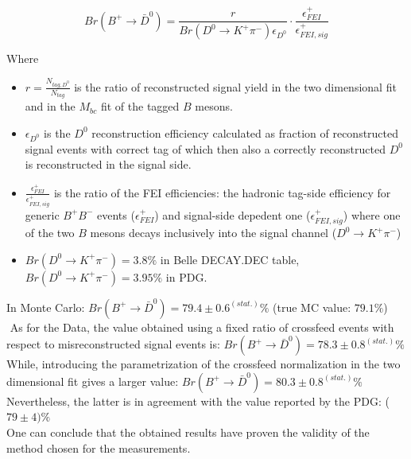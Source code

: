 \begin{equation}
    Br(B^+ \rightarrow \bar{D}^0) = \frac{r}{Br(D^0 \rightarrow K^+ \pi^-) \epsilon_{D^0}}  \cdot  \frac{\epsilon^{+}_{FEI}}{ \epsilon^{+}_{FEI,  sig} }
\end{equation}

Where 
\begin{itemize}

\item $r = \frac{N_{tag, D^0}}{N_{tag}}$ is the ratio of reconstructed signal yield in the two dimensional fit and in the $M_{bc}$ fit of the tagged $B$ mesons.
\item $\epsilon_{D^0} $ is the $D^0$ reconstruction efficiency calculated as fraction of reconstructed signal events with correct tag of which then also a correctly reconstructed $D^0$ is reconstructed in the signal side.
\item $\frac{\epsilon^{+}_{FEI}}{ \epsilon^{+}_{FEI,  sig }}$ is the ratio of the FEI efficiencies: the hadronic tag-side efficiency for generic $B^+B^-$ events ($\epsilon^{+}_{FEI}$) and signal-side depedent one ($\epsilon^{+}_{FEI,  sig}$)  where one of the two $B$ mesons decays inclusively into the signal channel ($D^0 \rightarrow K^+ \pi^- $) 
\item  $Br(D^0 \rightarrow K^+ \pi^-) = 3.8\% $ in Belle DECAY.DEC table,
$Br(D^0 \rightarrow K^+ \pi^-) = 3.95\% $ in PDG.
\end{itemize}

\vspace{0.2 cm}


In Monte Carlo:  \hspace{0.05cm} $Br(B^+ \rightarrow \bar{D}^0) = 79.4 \pm 0.6^{(stat.)} \%$ \hspace{1cm}  (true MC value: $79.1\%$) \\ %
\vspace{0.25 cm} \newline
\hspace{0.1cm}  $ $ As for the Data, the value obtained using a fixed ratio of crossfeed events with respect to misreconstructed signal events is:
  \hspace{0.05cm} $Br(B^+ \rightarrow \bar{D}^0) = 78.3 \pm 0.8^{(stat.)} \%$ \\
  \vspace{0.25 cm} \newline
  While, introducing the parametrization of the crossfeed normalization in the two dimensional fit gives a larger value:  \hspace{0.05cm} $Br(B^+ \rightarrow \bar{D}^0) = 80.3 \pm 0.8^{(stat.)} \%$ \\
  \vspace{0.25 cm}
  \noindent Nevertheless, the latter is in agreement with the value reported by the PDG:  ($79 \pm 4)\%$\\%
  One can conclude that the obtained results have proven the validity of  the method chosen for the measurements.
  


